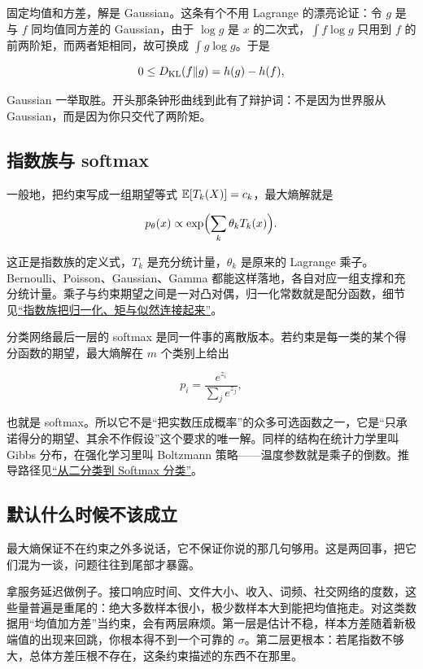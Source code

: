 固定均值和方差，解是 Gaussian。这条有个不用 Lagrange 的漂亮论证：令 \(g\) 是与 \(f\) 同均值同方差的 Gaussian，由于 \(\log g\) 是 \(x\) 的二次式，\(\int f\log g\) 只用到 \(f\) 的前两阶矩，而两者矩相同，故可换成 \(\int g\log g\)。于是

\[
0\le D_{\mathrm{KL}}(f\Vert g)=h(g)-h(f),
\]

Gaussian 一举取胜。开头那条钟形曲线到此有了辩护词：不是因为世界服从 Gaussian，而是因为你只交代了两阶矩。

\subsection{指数族与 softmax}

一般地，把约束写成一组期望等式 \(\mathbb{E}[T_k(X)]=c_k\)，最大熵解就是

\[
p_\theta(x)\propto\exp\Bigl(\sum_k\theta_kT_k(x)\Bigr).
\]

这正是指数族的定义式，\(T_k\) 是充分统计量，\(\theta_k\) 是原来的 Lagrange 乘子。Bernoulli、Poisson、Gaussian、Gamma 都能这样落地，各自对应一组支撑和充分统计量。乘子与约束期望之间是一对凸对偶，归一化常数就是配分函数，细节见\hyperref[sec:13-Machine-Learning/06-Probabilistic-Models/06]{``指数族把归一化、矩与似然连接起来''}。

分类网络最后一层的 softmax 是同一件事的离散版本。若约束是每一类的某个得分函数的期望，最大熵解在 \(m\) 个类别上给出

\[
p_i=\frac{e^{z_i}}{\sum_{j}e^{z_j}},
\]

也就是 softmax。所以它不是``把实数压成概率''的众多可选函数之一，它是``只承诺得分的期望、其余不作假设''这个要求的唯一解。同样的结构在统计力学里叫 Gibbs 分布，在强化学习里叫 Boltzmann 策略——温度参数就是乘子的倒数。推导路径见\hyperref[sec:13-Machine-Learning/02-Linear-Models/03]{``从二分类到 Softmax 分类''}。

\subsection{默认什么时候不该成立}

最大熵保证不在约束之外多说话，它不保证你说的那几句够用。这是两回事，把它们混为一谈，问题往往到尾部才暴露。

拿服务延迟做例子。接口响应时间、文件大小、收入、词频、社交网络的度数，这些量普遍是重尾的：绝大多数样本很小，极少数样本大到能把均值拖走。对这类数据用``均值加方差''当约束，会有两层麻烦。第一层是估计不稳，样本方差随着新极端值的出现来回跳，你根本得不到一个可靠的 \(\sigma\)。第二层更根本：若尾指数不够大，总体方差压根不存在，这条约束描述的东西不在那里。

